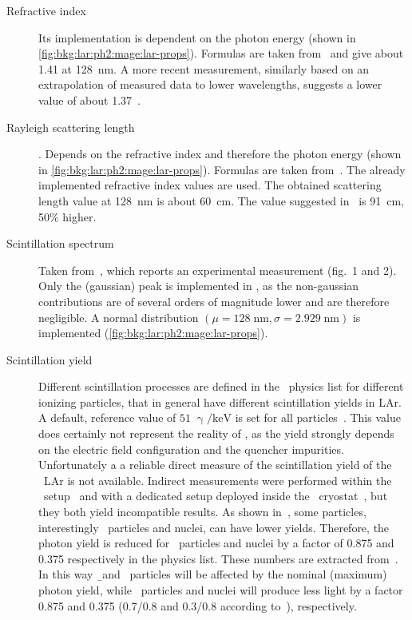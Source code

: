 \begin{description}

  \item[Refractive index] Its implementation is dependent on the photon energy (shown in
    \cref{fig:bkg:lar:ph2:mage:lar-props}). Formulas are taken from~\cite{Bideau-Mehu1981}
    and give about 1.41 at 128~nm. A more recent measurement, similarly based on an
    extrapolation of measured data to lower wavelengths, suggests a lower value of about
    1.37~\cite{Babicz2018}.

  \item[Rayleigh scattering length]. Depends on the refractive index and therefore the
    photon energy (shown in \cref{fig:bkg:lar:ph2:mage:lar-props}). Formulas are taken
    from~\cite{Seidel2002}. The already implemented refractive index values are used. The
    obtained scattering length value at 128~nm is about 60~cm. The value suggested
    in~\cite{Babicz2018} is 91~cm, 50\% higher.

  \item[Scintillation spectrum] Taken from~\cite{Heindl2010}, which reports an
    experimental measurement (fig.~1 and 2). Only the (gaussian) peak is implemented in
    \mage, as the non-gaussian contributions are of several orders of magnitude lower and
    are therefore negligible. A normal distribution $(\mu=128\;\text{nm},
    \sigma=2.929\;\text{nm})$ is implemented (\cref{fig:bkg:lar:ph2:mage:lar-props}).

  \item[Scintillation yield] Different scintillation processes are defined in the \mage\
    physics list for different ionizing particles, that in general have different
    scintillation yields in LAr. A default, reference value of $51\;\upgamma/\text{keV}$
    is set for all particles~\cite{Doke2002}. This value does certainly not represent the
    reality of \gerda, as the yield strongly depends on the electric field configuration
    and the quencher impurities. Unfortunately a a reliable direct measure of the
    scintillation yield of the \gerda\ LAr is not available.  Indirect measurements were
    performed within the \LArGe\ setup~\cite{Lehnert2015} and with a dedicated setup
    deployed inside the \gerda\ cryostat~\cite{Barros2020}, but they both yield
    incompatible results. As shown in~\cite{Doke2002}, some particles, interestingly \a\
    particles and nuclei, can have lower yields. Therefore, the photon yield is reduced
    for \a\ particles and nuclei by a factor of 0.875 and 0.375 respectively in the
    physics list. These numbers are extracted from~\cite{Doke2002}. In this way \b\ and
    \g\ particles will be affected by the nominal (maximum) photon yield, while \a\
    particles and nuclei will produce less light by a factor 0.875 and 0.375 (0.7/0.8 and
    0.3/0.8 according to~\cite{Doke2002}), respectively.


\end{description}
